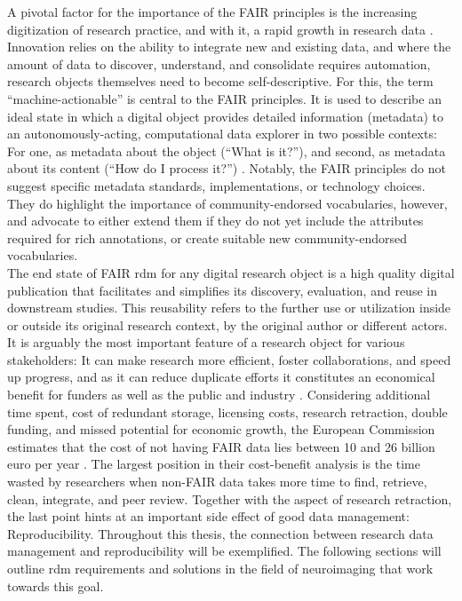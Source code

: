 A pivotal factor for the importance of the FAIR principles is the increasing digitization of research practice, and with it, a rapid growth in research data \citep{dfg}.
Innovation relies on the ability to integrate new and existing data, and where the amount of data to discover, understand, and consolidate requires automation, research objects themselves need to become self-descriptive.
For this, the term ``machine-actionable'' is central to the \gls{FAIR} principles.
It is used to describe an ideal state in which a digital object provides detailed information (metadata) to an autonomously-acting, computational data explorer in two possible contexts: For one, as metadata about the object (``What is it?''), and second, as metadata about its content (``How do I process it?'') \citep{wilkinson2016fair}.
Notably, the \gls{FAIR} principles do not suggest specific metadata standards, implementations, or technology choices.
They do highlight the importance of community-endorsed vocabularies, however, and advocate to either extend them if they do not yet include the attributes required for rich annotations, or create suitable new community-endorsed vocabularies. \\
The end state of FAIR \gls{rdm} for any digital research object is a high quality digital publication that facilitates and simplifies its discovery, evaluation, and reuse in downstream studies.
This reusability refers to the further use or utilization inside or outside its original research context, by the original author or different actors.
It is arguably the most important feature of a research object for various stakeholders: It can make research more efficient, foster collaborations, and speed up progress, and as it can reduce duplicate efforts it constitutes an economical benefit for funders as well as the public and industry \citep{nfdi2022data}.
Considering additional time spent, cost of redundant storage, licensing costs, research retraction, double funding, and missed potential for economic growth, the European Commission estimates that the cost of not having FAIR data lies between 10 and 26 billion euro per year \citep{eu2019FAIR}.
The largest position in their cost-benefit analysis is the time wasted by researchers when non-FAIR data takes more time to find, retrieve, clean, integrate, and peer review.
Together with the aspect of research retraction, the last point hints at an important side effect of good data management: Reproducibility.
Throughout this thesis, the connection between research data management and reproducibility will be exemplified.
The following sections will outline \gls{rdm} requirements and solutions in the field of neuroimaging that work towards this goal.


